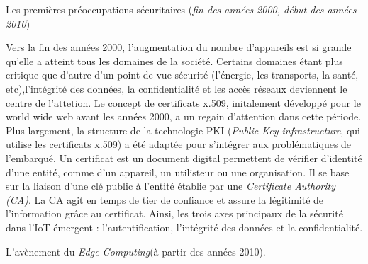 \vspace{0.1cm}

Les premières préoccupations sécuritaires (\textit{fin des années 2000, début des années 2010})

Vers la fin des années 2000, l'augmentation du nombre d'appareils est si grande qu'elle a atteint tous les domaines de la société. Certains domaines étant plus critique que d'autre d'un point de vue sécurité (l'énergie, les transports, la santé, etc),l'intégrité des données, la confidentialité et les accès réseaux deviennent le centre de l'attetion. 
Le concept de certificats x.509, initalement développé pour le world wide web avant les années 2000, a un regain d'attention dans cette période. Plus largement, la structure de la technologie PKI (\textit{Public Key infrastructure}, qui utilise les certificats x.509)\cite{PKI} a été adaptée pour s'intégrer aux problématiques de l'embarqué. Un certificat est un document digital permettent de vérifier d'identité d'une entité, comme d'un appareil, un utilisteur ou une organisation. Il se base sur la liaison d'une clé public à l'entité établie par une \textit{Certificate Authority (CA)}. La CA agit en temps de tier de confiance et assure la légitimité de l'information grâce au certificat. Ainsi, les trois axes principaux de la sécurité dans l'IoT émergent : l'autentification, l'intégrité des données et la confidentialité.

\vspace{0.1cm}

L'avènement du \textit{Edge Computing}(à partir des années 2010).

